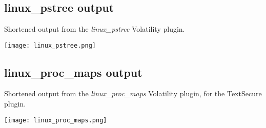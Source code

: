 \section{}

\subsection{linux\_pstree output}\label{pstree}
Shortened output from the \textit{linux\_pstree} Volatility plugin.

\texttt{[image: linux\_pstree.png]}


\subsection{linux\_proc\_maps output}\label{procmaps}
Shortened output from the \textit{linux\_proc\_maps} Volatility plugin, for the
TextSecure plugin.

\texttt{[image: linux\_proc\_maps.png]}
